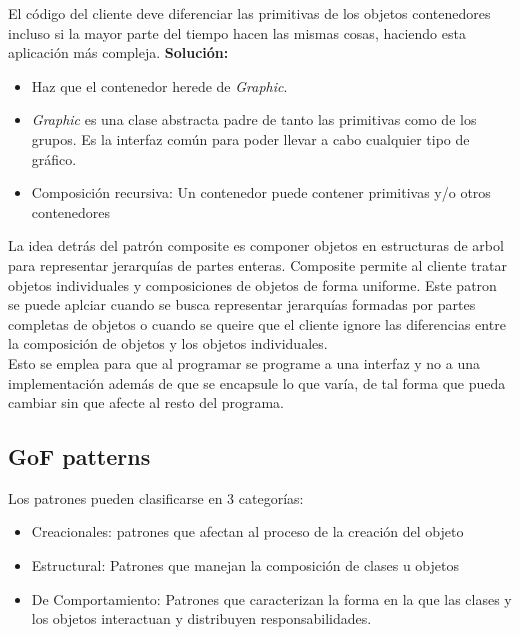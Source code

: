 \documentclass[11pt]{article}
\theoremstyle{plain}
\begin{document}
            El código del cliente deve diferenciar las primitivas de los objetos contenedores incluso si la mayor parte del tiempo hacen las mismas cosas, haciendo esta aplicación más compleja. \textbf{Solución:}
            \begin{itemize}
                \item Haz que el contenedor herede de \textit{Graphic}.
                \item \textit{Graphic} es una clase abstracta padre de tanto las primitivas como de los grupos. Es la interfaz común para poder llevar a cabo cualquier tipo de gráfico.
                \item Composición recursiva: Un contenedor puede contener primitivas y/o otros contenedores 
            \end{itemize}

            La idea detrás del patrón composite es componer objetos en estructuras de arbol para representar jerarquías de partes enteras. Composite permite al cliente tratar objetos individuales y composiciones de objetos de forma uniforme. Este patron se puede aplciar cuando se busca representar jerarquías formadas por partes completas de objetos o cuando se queire que el cliente ignore las diferencias entre la composición de objetos y los objetos individuales.\\

            Esto se emplea para que al programar se programe a una interfaz y no a una implementación además de que se encapsule lo que varía, de tal forma que pueda cambiar sin que afecte al resto del programa.
        \subsection{GoF patterns} %
        \label{sub:gof_patterns}
            Los patrones pueden clasificarse en 3 categorías:
            \begin{itemize}
                \item Creacionales: patrones que afectan al proceso de la creación del objeto
                \item Estructural: Patrones que manejan la composición de clases u objetos
                \item De Comportamiento: Patrones que caracterizan la forma en la que las clases y los objetos interactuan y distribuyen responsabilidades.
            \end{itemize}
\end{document}
